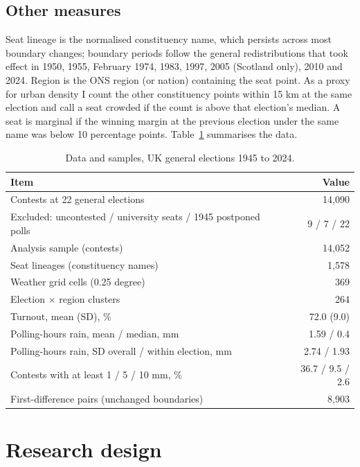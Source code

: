 \documentclass[11pt,a4paper]{article}
\begin{document}
\subsection{Other measures}
Seat lineage is the normalised constituency name, which persists across most boundary changes; boundary periods follow the general redistributions that took effect in 1950, 1955, February 1974, 1983, 1997, 2005 (Scotland only), 2010 and 2024. Region is the ONS region (or nation) containing the seat point. As a proxy for urban density I count the other constituency points within 15 km at the same election and call a seat crowded if the count is above that election's median. A seat is marginal if the winning margin at the previous election under the same name was below 10 percentage points. Table~\ref{tab:desc} summarises the data.

\begin{table}[tbp]\centering\small\caption{Data and samples, UK general elections 1945 to 2024.}\label{tab:desc}
\begin{tabular}{p{10cm}r}\toprule Item & Value\\\midrule
Contests at 22 general elections & 14,090\\
Excluded: uncontested / university seats / 1945 postponed polls & 9 / 7 / 22\\
Analysis sample (contests) & 14,052\\
Seat lineages (constituency names) & 1,578\\
Weather grid cells (0.25 degree) & 369\\
Election $\times$ region clusters & 264\\
\midrule
Turnout, mean (SD), \% & 72.0 (9.0)\\
Polling-hours rain, mean / median, mm & 1.59 / 0.4\\
Polling-hours rain, SD overall / within election, mm & 2.74 / 1.93\\
Contests with at least 1 / 5 / 10 mm, \% & 36.7 / 9.5 / 2.6\\
First-difference pairs (unchanged boundaries) & 8,903\\
\bottomrule\end{tabular}\end{table}

\section{Research design}\label{sec:design}
\end{document}
